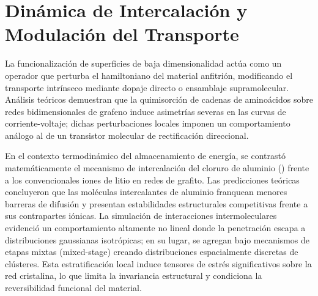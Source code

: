 \section{Dinámica de Intercalación y Modulación del Transporte}
\label{sec:intercalacion}

La funcionalización de superficies de baja dimensionalidad actúa como un
operador que perturba el hamiltoniano del material anfitrión, modificando el
transporte intrínseco mediante dopaje directo o ensamblaje supramolecular.
Análisis teóricos demuestran que la quimisorción de cadenas de aminoácidos sobre
redes bidimensionales de grafeno induce asimetrías severas en las curvas de
corriente-voltaje; dichas perturbaciones locales imponen un comportamiento
análogo al de un transistor molecular de rectificación direccional.

En el contexto termodinámico del almacenamiento de energía, se contrastó
matemáticamente el mecanismo de intercalación del cloruro de aluminio
() frente a los convencionales iones de litio en redes de grafito.
Las predicciones teóricas concluyeron que las moléculas intercalantes de
aluminio franquean menores barreras de difusión y presentan estabilidades
estructurales competitivas frente a sus contrapartes iónicas. La simulación de
interacciones intermoleculares evidenció un comportamiento altamente no lineal
donde la penetración escapa a distribuciones gaussianas isotrópicas; en su
lugar, se agregan bajo mecanismos de etapas mixtas (mixed-stage) creando
distribuciones espacialmente discretas de clústeres. Esta estratificación local
induce tensores de estrés significativos sobre la red cristalina, lo que limita
la invariancia estructural y condiciona la reversibilidad funcional del
material.


